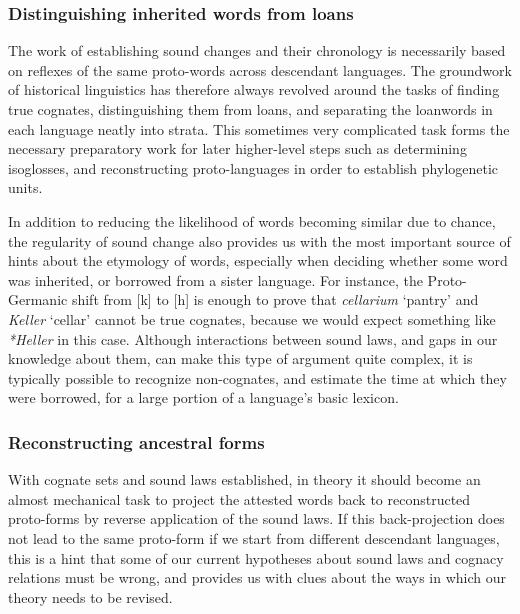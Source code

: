 \subsubsection{Distinguishing inherited words from loans}
The work of establishing sound changes and their chronology is necessarily based on reflexes of the same proto-words across descendant languages. The groundwork of historical linguistics has therefore always revolved around the tasks of finding true cognates, distinguishing them from loans, and separating the loanwords in each language neatly into strata. This sometimes very complicated task forms the necessary preparatory work for later higher-level steps such as determining isoglosses, and reconstructing proto-languages in order to establish phylogenetic units.

In addition to reducing the likelihood of words becoming similar due to chance, the regularity of sound change also provides us with the most important source of hints about the etymology of words, especially when deciding whether some word was inherited, or borrowed from a sister language. For instance, the Proto-Germanic shift from [k] to [h] is enough to prove that  \textit{cellarium} `pantry' and  \textit{Keller} `cellar' cannot be true cognates, because we would expect something like \textit{*Heller} in this case. Although interactions between sound laws, and gaps in our knowledge about them, can make this type of argument quite complex, it is typically possible to recognize non-cognates, and estimate the time at which they were borrowed, for a large portion of a language's basic lexicon.

\subsubsection{Reconstructing ancestral forms}
With cognate sets and sound laws established, in theory it should become an almost mechanical task to project the attested words back to reconstructed proto-forms by reverse application of the sound laws. If this back-projection does not lead to the same proto-form if we start from different descendant languages, this is a hint that some of our current hypotheses about sound laws and cognacy relations must be wrong, and provides us with clues about the ways in which our theory needs to be revised.


